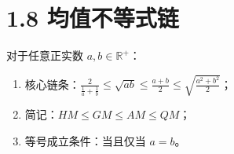 \documentclass{article}
\begin{document}
\section*{1.8 均值不等式链}
对于任意正实数 \( a,b \in \mathbb{R}^+ \)：
\begin{enumerate}
    \item 核心链条：\( \frac{2}{\frac{1}{a}+\frac{1}{b}} \leq \sqrt{ab} \leq \frac{a+b}{2} \leq \sqrt{\frac{a^2+b^2}{2}} \)；
    \item 简记：\( HM \leq GM \leq AM \leq QM \)；
    \item 等号成立条件：当且仅当 \( a=b \)。
\end{enumerate}
\end{document}
